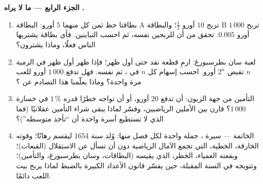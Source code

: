 \begin{problem}
\medskip
\noindent\textbf{الجزء الرابع --- ما لا يراه .}
\begin{enumerate}[resume]
  \item بطاقتا حظ ثمن كل منهما $5$ أورو: البطاقة A تربح $10$ أورو
         $\frac12$؛ والبطاقة B تربح $1\,000$ أورو
         $0.005$. تحقق من أن للربحين
         نفسه، ثم احسب التباينين. فأي
        بطاقة يشتريها الناس فعلًا، وماذا يشترون؟
  \item لعبة سان بطرسبورغ: ارمِ قطعة نقد حتى أول ظهر؛
        فإذا ظهر أول ظهر في الرمية $n$ تقبض
        $2^n$ أورو. احسب إسهام كل $n$ في
        ، ثم  نفسه. فهل تدفع
        $1\,000$ أورو للعب مرة واحدة؟ وماذا يعلّمنا هذا التصادم
        عن ؟
  \item التأمين من جهة الزبون: أن تدفع $20$ أورو، أو
        أن تواجه خطرًا قدره $1\,\%$ في خسارة $1\,000$؟ قارن بين
        الأملين الرياضيين، وفسّر لماذا يبقى شراء التأمين
        عقلانيًا (فما الذي لا تستطيع أسرة واحدة أن
        ``تأخذ متوسطه'')؟
  \item الخاتمة --- سيرة ، جملة واحدة لكل
        فصل منها: وُلد سنة 1654 ليقسم رهانًا؛ وقوته الخارقة،
        الخطية، التي تجمع الآمال الرياضية دون أن تسأل عن
        الاستقلال (القبعات)؛ وبقعته العمياء، الخطر، الذي يقيسه
         (البطاقات، وسان بطرسبورغ، والتأمين)؛
        وتتويجه في السنة المقبلة، حين يفسّر قانون الأعداد
        الكبيرة بالضبط لماذا يربح بيت اللعب دائمًا.
\end{enumerate}
\end{problem}
